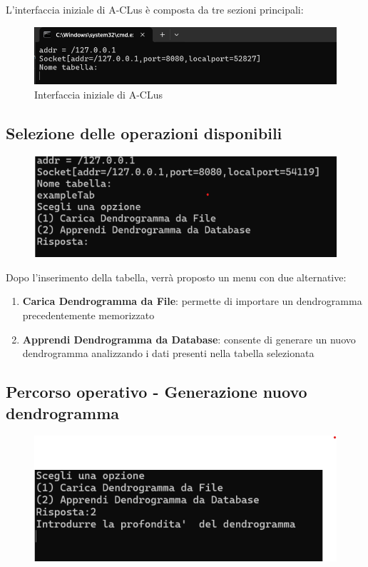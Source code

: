 L'interfaccia iniziale di A-CLus è composta da tre sezioni principali:

\begin{figure}[h!]
    \centering
    \includegraphics[width=\textwidth]{images/client in esecuzione.png}
    \caption{Interfaccia iniziale di A-CLus}
\end{figure}

\subsection{Selezione delle operazioni disponibili}

\begin{figure}[h!]
    \centering
    \includegraphics[width=\textwidth]{images/inserimento_tabella.png}
\end{figure}

Dopo l'inserimento della tabella, verrà proposto un menu con due alternative:
\begin{enumerate}
    \item \textbf{Carica Dendrogramma da File}: permette di importare un dendrogramma precedentemente memorizzato
    \item \textbf{Apprendi Dendrogramma da Database}: consente di generare un nuovo dendrogramma analizzando i dati presenti nella tabella selezionata
\end{enumerate}

\subsection{Percorso operativo - Generazione nuovo dendrogramma}

\begin{figure}[h!]
    \centering
    \includegraphics[width=\textwidth]{images/apprendi_datagramma.png}
\end{figure}

